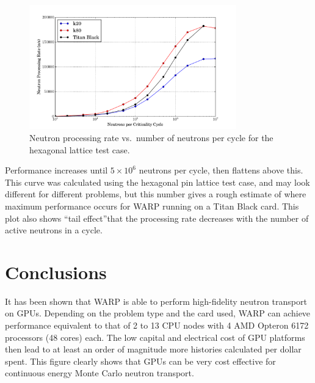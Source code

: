 \documentclass[preprint,12pt]{elsarticle}
\begin{document}
\begin{figure}[h!]
\centering
\includegraphics[width=0.8\textwidth,trim= 1cm 0cm 1cm 0cm]{graphics/scaling.pdf}
\caption{Neutron processing rate vs.\ number of neutrons per cycle for the hexagonal lattice test case. \label{scaling} }
\end{figure}

Performance increases until $5\times10^6$ neutrons per cycle, then flattens above this.  This curve was calculated using the hexagonal pin lattice test case, and may look different for different problems, but this number gives a rough estimate of where maximum performance occurs for WARP running on a Titan Black card.  This plot also shows ``tail effect''\textemdash that the processing rate decreases with the number of active neutrons in a cycle.  


\section{Conclusions}
\label{sec:conc}

It has been shown that WARP is able to perform high-fidelity neutron transport on GPUs.  Depending on the problem type and the card used, WARP can achieve performance equivalent to that of 2 to 13 CPU nodes with 4 AMD Opteron 6172 processors (48 cores) each.  The low capital and electrical cost of GPU platforms then lead to at least an order of magnitude more histories calculated per dollar spent.  This figure clearly shows that GPUs can be  very cost effective for continuous energy Monte Carlo neutron transport.
\end{document}

